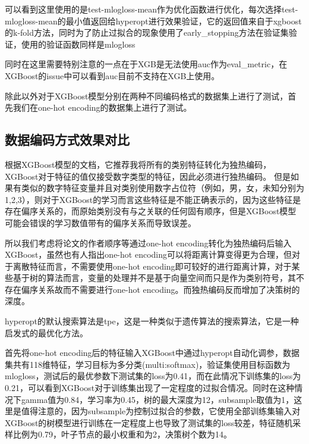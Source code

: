 可以看到这里使用的是test-mlogloss-mean作为优化函数进行优化，每次选择test-mlogloss-mean的最小值返回给hyperopt进行效果验证，它的返回值来自于xgboost的k-fold方法，同时为了防止过拟合的现象使用了early\_stopping方法在验证集验证，使用的验证函数同样是mlogloss

同时在这里需要特别注意的一点在于XGB是无法使用auc作为eval\_metric，在XGBoost的issue中可以看到auc目前不支持在XGB上使用。

除此以外对于XGBoost模型分别在两种不同编码格式的数据集上进行了测试，首先我们在one-hot encoding的数据集上进行了测试。

\subsection{数据编码方式效果对比}

根据XGBoost模型的文档，它推荐我将所有的类别特征转化为独热编码，XGBoost对于特征的值仅接受数字类型的特征，因此必须进行独热编码。 但是如果有类似的数字特征变量并且对类别使用数字占位符（例如，{男，女，未知}分别为{1,2,3}），则对于XGBoost的学习而言这些特征是不能正确表示的，因为这些特征是存在偏序关系的，而原始类别没有与之关联的任何固有顺序，但是XGBoost模型可能会错误的学习数值带有的偏序关系而导致误差。

所以我们考虑将论文的作者顺序等通过one-hot encoding转化为独热编码后输入XGBoost，虽然也有人指出one-hot encoding可以将距离计算变得更为合理，但对于离散特征而言，不需要使用one-hot encoding即可较好的进行距离计算，对于某些基于树的算法而言，变量的处理并不是基于向量空间而只是作为类别符号，其不存在偏序关系故而不需要进行one-hot encoding。而独热编码反而增加了决策树的深度。

hyperopt的默认搜索算法是tpe，这是一种类似于遗传算法的搜索算法，它是一种启发式的最优化方法。

首先将one-hot encoding后的特征输入XGBoost中通过hyperopt自动化调参，数据集共有118维特征，学习目标为多分类(multi:softmax)，验证集使用目标函数为mlogloss，测试后的最优参数下测试集的loss为0.41，而在此情况下训练集的loss为0.21，可以看到XGBoost对于训练集出现了一定程度的过拟合情况。同时在这种情况下gamma值为0.84，学习率为0.45，树的最大深度为12，subsample取值为1，这里是值得注意的，因为subsample为控制过拟合的参数，它使用全部训练集输入对XGBoost的树模型进行训练在一定程度上也导致了测试集的loss较差，特征随机采样比例为0.79，叶子节点的最小权重和为2，决策树个数为14。

